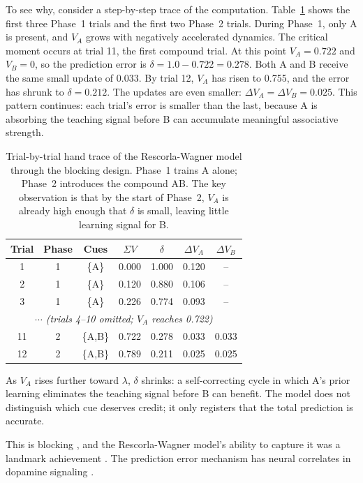 \documentclass[fleqn,10pt]{wlscirep}
\begin{document}
\begin{linenumbers}
To see why, consider a step-by-step trace of the computation. Table~\ref{tab:handtrace} shows the first three Phase~1 trials and the first two Phase~2 trials. During Phase~1, only A is present, and $V_A$ grows with negatively accelerated dynamics. The critical moment occurs at trial 11, the first compound trial. At this point $V_A = 0.722$ and $V_B = 0$, so the prediction error is $\delta = 1.0 - 0.722 = 0.278$. Both A and B receive the same small update of 0.033. By trial 12, $V_A$ has risen to 0.755, and the error has shrunk to $\delta = 0.212$. The updates are even smaller: $\Delta V_A = \Delta V_B = 0.025$. This pattern continues: each trial's error is smaller than the last, because A is absorbing the teaching signal before B can accumulate meaningful associative strength.

\begin{table}[t]
\centering
\small
\caption{Trial-by-trial hand trace of the Rescorla-Wagner model through the blocking design. Phase~1 trains A alone; Phase~2 introduces the compound AB. The key observation is that by the start of Phase~2, $V_A$ is already high enough that $\delta$ is small, leaving little learning signal for B.}
\label{tab:handtrace}
\begin{tabular}{ccccccc}
\toprule
Trial & Phase & Cues & $\Sigma V$ & $\delta$ & $\Delta V_A$ & $\Delta V_B$ \\
\midrule
1 & 1 & \{A\} & 0.000 & 1.000 & 0.120 & -- \\
2 & 1 & \{A\} & 0.120 & 0.880 & 0.106 & -- \\
3 & 1 & \{A\} & 0.226 & 0.774 & 0.093 & -- \\
\multicolumn{7}{c}{\emph{$\cdots$ (trials 4--10 omitted; $V_A$ reaches 0.722)}} \\
11 & 2 & \{A,B\} & 0.722 & 0.278 & 0.033 & 0.033 \\
12 & 2 & \{A,B\} & 0.789 & 0.211 & 0.025 & 0.025 \\
\bottomrule
\end{tabular}
\end{table}

As $V_A$ rises further toward $\lambda$, $\delta$ shrinks: a self-correcting cycle in which A's prior learning eliminates the teaching signal before B can benefit. The model does not distinguish which cue deserves credit; it only registers that the total prediction is accurate.

This is blocking \citep{kamin1969predictability}, and the Rescorla-Wagner model's ability to capture it was a landmark achievement \citep{rescorla1972theory}. The prediction error mechanism has neural correlates in dopamine signaling \citep{schultz1997neural}.


\end{linenumbers}
\end{document}
